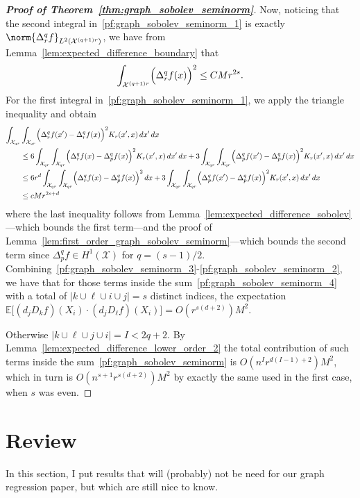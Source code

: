 \documentclass{article}
\newcommand{\abs}[1]{\left \lvert #1 \right \rvert}
\newcommand{\1}{\mathbf{1}}
\newcommand{\Xset}{\mathcal{X}}
\newcommand{\Leb}{L}
\newcommand{\Ebb}{\mathbb{E}}
\theoremstyle{alden}
\theoremstyle{aldenthm}
\theoremstyle{definition}
\theoremstyle{remark}
\begin{document}
\begin{proof}[\textbf{Proof of Theorem~\ref{thm:graph_sobolev_seminorm}}]
	Now, noticing that the second integral in~\eqref{pf:graph_sobolev_seminorm_1} is exactly $\norm{\Delta_r^{q}f}_{\Leb^2(\Xset^{(q + 1)r})}$, we have from Lemma~\ref{lem:expected_difference_boundary} that
	\begin{equation}
	\label{pf:graph_sobolev_seminorm_5}
	\int_{\Xset^{(q + 1)r}} \Bigl(\Delta_r^qf(x)\Bigr)^2 \leq CMr^{2s}.
	\end{equation}
	For the first integral in~\eqref{pf:graph_sobolev_seminorm_1}, we apply the triangle inequality and obtain
	\begin{align}
	\int_{\Xset_{qr}} & \int_{\Xset_{qr}} \Bigl(\Delta_r^qf(x') - \Delta_r^qf(x)\Bigr)^2 K_r(x',x) \,dx' \,dx \nonumber \\
	& \leq 6 \int_{\Xset_{qr}} \int_{\Xset_{qr}} \Bigl(\Delta_r^qf(x) - \Delta_p^qf(x) \Bigr)^2 K_r(x',x) \,dx' \,dx + 3 \int_{\Xset_{qr}} \int_{\Xset_{qr}} \Bigl(\Delta_p^qf(x') - \Delta_p^qf(x) \Bigr)^2 K_r(x',x) \,dx' \,dx \nonumber \\
	& \leq 6r^d \int_{\Xset_{qr}} \int_{\Xset_{qr}} \Bigl(\Delta_r^qf(x) - \Delta_p^qf(x) \Bigr)^2 \,dx + 3 \int_{\Xset_{qr}} \int_{\Xset_{qr}} \Bigl(\Delta_p^qf(x') - \Delta_p^qf(x) \Bigr)^2 K_r(x',x) \,dx' \,dx \nonumber \\
	& \leq c M r^{2s + d} \label{pf:graph_sobolev_seminorm_2}
	\end{align}
	where the last inequality follows from Lemma~\ref{lem:expected_difference_sobolev}---which bounds the first term---and the proof of Lemma~\ref{lem:first_order_graph_sobolev_seminorm}---which bounds the second term since $\Delta_p^qf \in H^1(\Xset)$ for $q = (s - 1)/2$. Combining~\eqref{pf:graph_sobolev_seminorm_3}-\eqref{pf:graph_sobolev_seminorm_2}, we have that for those terms inside the sum~\eqref{pf:graph_sobolev_seminorm_4} with a total of $\abs{k \cup \ell \cup i \cup j} = s$ distinct indices, the expectation $\Ebb\bigl[(d_jD_kf)(X_i) \cdot (d_jD_{\ell}f)(X_i)\bigr] = O(r^{s(d + 2)})M^2$.
	
	Otherwise $\abs{k \cup \ell \cup j \cup i} = I < 2q + 2$.  By Lemma~\ref{lem:expected_difference_lower_order_2} the total contribution of such terms inside the sum~\eqref{pf:graph_sobolev_seminorm} is $O(n^{I}r^{d(I - 1) + 2}) M^2$, which in turn is $O(n^{s + 1}r^{s(d + 2)})M^2$ by exactly the same used in the first case, when $s$ was even.
\end{proof}

\section{Review}
In this section, I put results that will (probably) not be need for our graph regression paper, but which are still nice to know.
\end{document}
